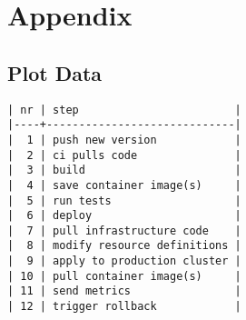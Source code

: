 \chapter*{Appendix}
\section*{Plot Data}
\begin{verbatim}
| nr | step                        |
|----+-----------------------------|
|  1 | push new version            |
|  2 | ci pulls code               |
|  3 | build                       |
|  4 | save container image(s)     |
|  5 | run tests                   |
|  6 | deploy                      |
|  7 | pull infrastructure code    |
|  8 | modify resource definitions |
|  9 | apply to production cluster |
| 10 | pull container image(s)     |
| 11 | send metrics                |
| 12 | trigger rollback            |


\end{verbatim}
